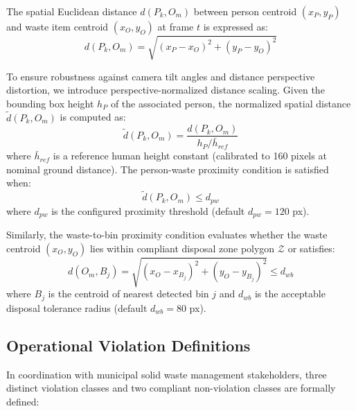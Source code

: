 \documentclass[conference]{IEEEtran}
\begin{document}
The spatial Euclidean distance $d(P_k, O_m)$ between person centroid $(x_{P}, y_{P})$ and waste item centroid $(x_{O}, y_{O})$ at frame $t$ is expressed as:
\begin{equation}
d(P_k, O_m) = \sqrt{(x_{P} - x_{O})^2 + (y_{P} - y_{O})^2}
\end{equation}

To ensure robustness against camera tilt angles and distance perspective distortion, we introduce perspective-normalized distance scaling. Given the bounding box height $h_{P}$ of the associated person, the normalized spatial distance $\tilde{d}(P_k, O_m)$ is computed as:
\begin{equation}
\tilde{d}(P_k, O_m) = \frac{d(P_k, O_m)}{h_{P} / \bar{h}_{ref}}
\end{equation}
where $\bar{h}_{ref}$ is a reference human height constant (calibrated to 160 pixels at nominal ground distance). The person-waste proximity condition is satisfied when:
\begin{equation}
\tilde{d}(P_k, O_m) \leq d_{pw}
\end{equation}
where $d_{pw}$ is the configured proximity threshold (default $d_{pw} = 120$ px).

Similarly, the waste-to-bin proximity condition evaluates whether the waste centroid $(x_O, y_O)$ lies within compliant disposal zone polygon $\mathcal{Z}$ or satisfies:
\begin{equation}
d(O_m, B_j) = \sqrt{(x_O - x_{B_j})^2 + (y_O - y_{B_j})^2} \leq d_{wb}
\end{equation}
where $B_j$ is the centroid of nearest detected bin $j$ and $d_{wb}$ is the acceptable disposal tolerance radius (default $d_{wb} = 80$ px).

\subsection{Operational Violation Definitions}

In coordination with municipal solid waste management stakeholders, three distinct violation classes and two compliant non-violation classes are formally defined:
\end{document}
